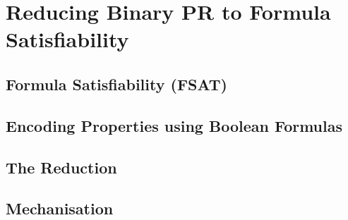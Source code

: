 \chapter{Reducing Binary PR to Formula Satisfiability}\label{chap:bpr_fsat}

\section{Formula Satisfiability (FSAT)}

\section{Encoding Properties using Boolean Formulas}

\section{The Reduction}

\section{Mechanisation}
